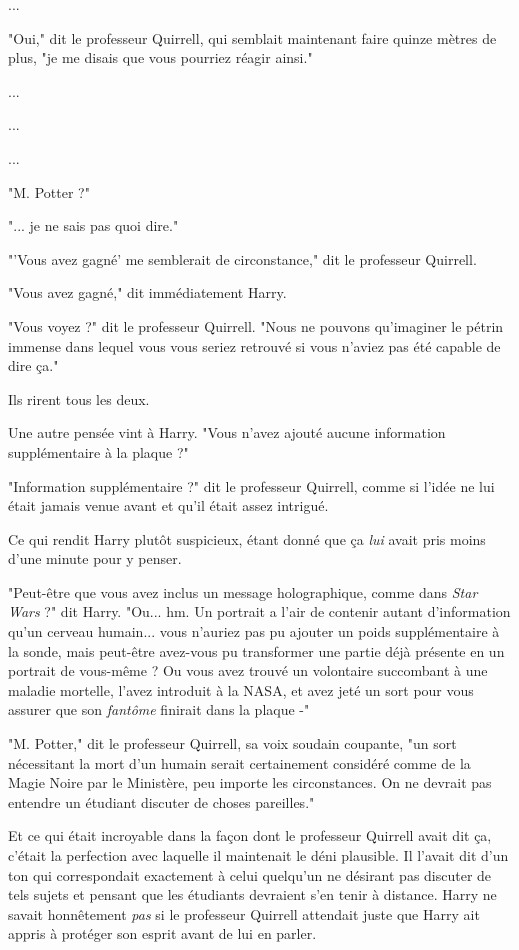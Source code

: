 ...

"Oui," dit le professeur Quirrell, qui semblait maintenant faire quinze mètres de plus, "je me disais que vous pourriez réagir ainsi."

...

...

...

"M. Potter ?"

"... je ne sais pas quoi dire."

"'Vous avez gagné' me semblerait de circonstance," dit le professeur Quirrell.

"Vous avez gagné," dit immédiatement Harry.

"Vous voyez ?" dit le professeur Quirrell. "Nous ne pouvons qu'imaginer le pétrin immense dans lequel vous vous seriez retrouvé si vous n'aviez pas été capable de dire ça."

Ils rirent tous les deux.

Une autre pensée vint à Harry. "Vous n'avez ajouté aucune information supplémentaire à la plaque ?"

"Information supplémentaire ?" dit le professeur Quirrell, comme si l'idée ne lui était jamais venue avant et qu'il était assez intrigué.

Ce qui rendit Harry plutôt suspicieux, étant donné que ça \emph{lui}  avait pris moins d'une minute pour y penser.

"Peut-être que vous avez inclus un message holographique, comme dans \emph{Star Wars}  ?" dit Harry. "Ou... hm. Un portrait a l'air de contenir autant d'information qu'un cerveau humain... vous n'auriez pas pu ajouter un poids supplémentaire à la sonde, mais peut-être avez-vous pu transformer une partie déjà présente en un portrait de vous-même ? Ou vous avez trouvé un volontaire succombant à une maladie mortelle, l'avez introduit à la NASA, et avez jeté un sort pour vous assurer que son \emph{fantôme}  finirait dans la plaque -"

"M. Potter," dit le professeur Quirrell, sa voix soudain coupante, "un sort nécessitant la mort d'un humain serait certainement considéré comme de la Magie Noire par le Ministère, peu importe les circonstances. On ne devrait pas entendre un étudiant discuter de choses pareilles."

Et ce qui était incroyable dans la façon dont le professeur Quirrell avait dit ça, c'était la perfection avec laquelle il maintenait le déni plausible. Il l'avait dit d'un ton qui correspondait exactement à celui quelqu'un ne désirant pas discuter de tels sujets et pensant que les étudiants devraient s'en tenir à distance. Harry ne savait honnêtement \emph{pas}  si le professeur Quirrell attendait juste que Harry ait appris à protéger son esprit avant de lui en parler.

